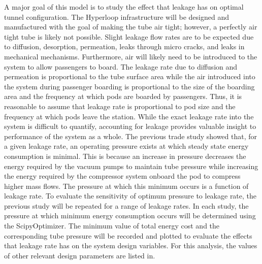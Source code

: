 A major goal of this model is to study the effect that leakage has on optimal
tunnel configuration. The Hyperloop infrastructure will be designed and
manufactured with the goal of making the tube air tight; however, a perfectly
air tight tube is likely not possible. Slight leakage flow rates are to be
expected due to diffusion, desorption, permeation, leaks through micro cracks,
and leaks in mechanical mechanisms. Furthermore, air will likely need to be
introduced to the system to allow passengers to board. The leakage rate due to
diffusion and permeation is proportional to the tube surface area while the air
introduced into the system during passenger boarding is proportional to the
size of the boarding area and the frequency at which pods are boarded by passengers.
Thus, it is reasonable to assume that leakage rate is proportional to pod size
and the frequency at which pods leave the station. While the exact leakage rate
into the system is difficult to quantify, accounting for leakage provides
valuable insight to performance of the system as a whole.
The previous trade study showed that, for a given leakage rate, an operating
pressure exists at which steady state energy consumption is minimal.
This is because an increase in pressure decreases the energy required by the
vacuum pumps to maintain tube pressure while increasing the energy required by
the compressor system onboard the pod to compress higher mass flows.
The pressure at which this minimum occurs is a function of leakage rate.
To evaluate the sensitivity of optimum pressure to leakage rate, the previous
study will be repeated for a range of leakage rates. In each study, the
pressure at which minimum energy consumption occurs will be determined using
the ScipyOptimizer. The minimum value of total energy cost and the
corresponding tube pressure will be recorded and plotted to evaluate the
effects that leakage rate has on the system design variables.
For this analysis, the values of other relevant design parameters are listed in.
